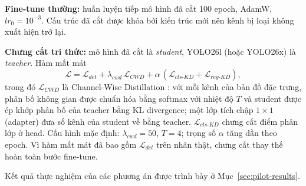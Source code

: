 \textbf{Fine-tune thường:} huấn luyện tiếp mô hình đã cắt 100 epoch, AdamW,
$lr_0 = 10^{-3}$. Cấu trúc đã cắt được khóa bởi kiến trúc mới nên kênh bị loại
không xuất hiện trở lại.

\textbf{Chưng cất tri thức:} mô hình đã cắt là \emph{student}, YOLO26l (hoặc
YOLO26x) là \emph{teacher}. Hàm mất mát
\begin{equation}
  \mathcal{L} = \mathcal{L}_{det} + \lambda_{cwd}\,\mathcal{L}_{CWD}
  + \alpha\,(\mathcal{L}_{cls\text{-}KD} + \mathcal{L}_{reg\text{-}KD}),
\end{equation}
trong đó $\mathcal{L}_{CWD}$ là Channel-Wise Distillation \cite{shu2021cwd}: với
mỗi kênh của bản đồ đặc trưng, phân bố không gian được chuẩn hóa bằng softmax với
nhiệt độ $T$ và student được ép khớp phân bố của teacher bằng KL divergence; một
lớp tích chập $1\times1$ (adapter) đưa số kênh của student về bằng teacher.
$\mathcal{L}_{cls\text{-}KD}$ chưng cất điểm phân lớp ở head. Cấu hình mặc định:
$\lambda_{cwd}=50$, $T=4$; trọng số $\alpha$ tăng dần theo epoch. Vì hàm mất mát
đã bao gồm $\mathcal{L}_{det}$ trên nhãn thật, chưng cất thay thế hoàn toàn bước
fine-tune.

Kết quả thực nghiệm của các phương án được trình bày ở Mục~\ref{sec:pilot-results}.
